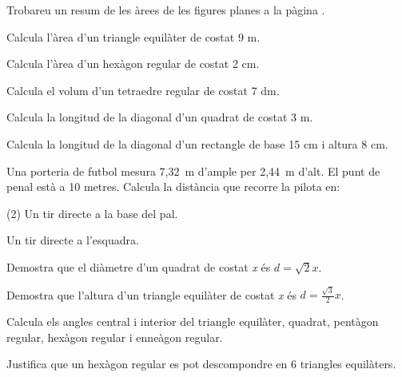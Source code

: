 \begin{theorybox}	
	Trobareu un resum de les àrees de les figures planes a la pàgina \pageref{sec:resumarees}.
\end{theorybox}


\begin{mylist}

\exer  Calcula l'àrea d'un triangle equilàter de costat 9 m. 

\exer  Calcula l'àrea d'un hexàgon regular de costat 2 cm. 

\exer  \hot Calcula el volum d'un tetraedre regular de costat 7 dm.

\exer  Calcula la longitud de la diagonal d'un quadrat de costat 3 m.

\exer  Calcula la longitud de la diagonal d'un rectangle de base 15 cm i altura 8 cm.
\answers{17 cm}

\exer  Una porteria de futbol mesura 7,32~m d'ample per 2,44~m d'alt. El punt de penal està a 10 metres. Calcula la distància que recorre la pilota en:

\begin{tasks}(2)
	\task  Un tir directe a la base del pal.

 
	\task  Un tir directe a l'esquadra.
\end{tasks}
\answers{[10.65 m, 10.92 m]}


\exer  Demostra que el diàmetre d'un quadrat de costat \textit{x} és $d=\sqrt{2} x$.
 

\exer  Demostra que l'altura d'un triangle equilàter de costat \textit{x} és $d=\frac{\sqrt{3} }{2} x$. 
 

\exer  Calcula els angles central i interior del triangle equilàter, quadrat, pentàgon regular, hexàgon regular i enneàgon regular.

\exer  Justifica que un hexàgon regular es pot descompondre en 6 triangles equilàters.


\end{mylist}
